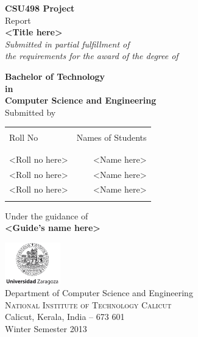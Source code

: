 
\renewcommand\refname{References} %

\begin{titlepage}

\begin{center}

\textup{\small {\bf CSU498 Project} \\ Report}\\[0.2in]

\Large \textbf {<Title here>}\\[0.5in]

       \small \emph{Submitted in partial fulfillment of\\
        the requirements for the award of the degree of}
        \vspace{.2in}

       {\bf Bachelor of Technology \\in\\ Computer Science and Engineering}\\[0.5in]

\normalsize Submitted by \\
\begin{table}[h]
\centering
\begin{tabular}{lr}\hline \\
Roll No & Names of Students \\ \\ \hline
\\
<Roll no here> & <Name here> \\
<Roll no here> & <Name here> \\
<Roll no here> & <Name here> \\ \\ \hline
\end{tabular}
\end{table}

\vspace{.1in}
Under the guidance of\\
{\textbf{<Guide's name here>}}\\[0.2in]

\vfill

\includegraphics[width=0.18\textwidth]{images/logo.png}\\[0.1in]
\Large{Department of Computer Science and Engineering}\\
\normalsize
\textsc{National Institute of Technology Calicut}\\
Calicut, Kerala, India -- 673 601 \\
\vspace{0.2cm}
Winter Semester 2013

\end{center}

\end{titlepage}

\tableofcontents
\listoffigures

\newpage
{} %
